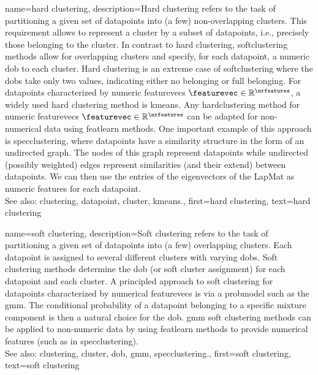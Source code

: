 {name={hard clustering}, 
	description={Hard \gls{clustering} 
		refers to the task of partitioning a given set of \glspl{datapoint} 
		into (a few) non-overlapping \glspl{cluster}. This requirement 
		allows to represent a \gls{cluster} by a subset of \glspl{datapoint}, 
		i.e., precisely those belonging to the \gls{cluster}. In contrast to 
		hard \gls{clustering}, \gls{softclustering} methods allow for overlapping 
		\glspl{cluster} and specify, for each \gls{datapoint}, a numeric \gls{dob} 
		to each \gls{cluster}. Hard \gls{clustering} is an extreme case of \gls{softclustering} 
		where the \glspl{dob} take only two values, indicating either no belonging or 
		full belonging. 
		For \glspl{datapoint} characterized by numeric \glspl{featurevec} $\featurevec \in \mathbb{R}^{\nrfeatures}$, 
		a widely used hard \gls{clustering} method is \gls{kmeans}. Any 
		\gls{hardclustering} method for numeric \glspl{featurevec} $\featurevec \in \mathbb{R}^{\nrfeatures}$ can 
		be adapted for non-numerical \gls{data} using \gls{featlearn} methods. 
		One important example of this approach is \gls{specclustering}, where 
		\glspl{datapoint} have a similarity structure in the form of an undirected 
		\gls{graph}. The nodes of this \gls{graph} represent \glspl{datapoint} 
		while undirected (possibly weighted) edges represent similarities (and their 
		extend) between \glspl{datapoint}. We can then use the entries of the 
		\glspl{eigenvector} of the \gls{LapMat} as numeric \glspl{feature} for 
		each \gls{datapoint}. 
		\\
		See also: \gls{clustering}, \gls{datapoint}, \gls{cluster}, \gls{kmeans}.},
	first={hard clustering},
	text={hard clustering} 
}
	
{name={soft clustering}, 
	description={Soft \gls{clustering} 
		refers to the task of partitioning a given set of \glspl{datapoint} into (a few) 
		overlapping \glspl{cluster}. Each \gls{datapoint} is assigned to several different 
		\glspl{cluster} with varying \glspl{dob}. Soft \gls{clustering} methods determine the 
		\gls{dob} (or soft \gls{cluster} assignment) for each \gls{datapoint} and each \gls{cluster}.
		A principled approach to soft \gls{clustering} for \glspl{datapoint} characterized by 
		numerical \glspl{featurevec} is via a \gls{probmodel} such as the \gls{gmm}. 
		The conditional \gls{probability} of a \gls{datapoint} belonging to a specific mixture 
		component is then a natural choice for the \gls{dob}. \Gls{gmm} soft \gls{clustering} 
		methods can be applied to non-numeric \gls{data} by using \gls{featlearn} methods 
		to provide numerical \glspl{feature} (such as in \gls{specclustering}). 
				\\
		See also: \gls{clustering}, \gls{cluster}, \gls{dob}, \gls{gmm}, \gls{specclustering}.},
	first={soft clustering},
	text={soft clustering} 
}

